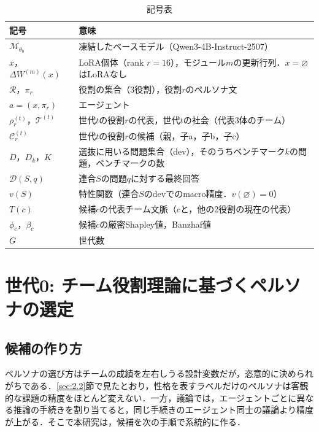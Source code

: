 \begin{table}[htbp]
\caption{記号表}
\label{tab:3.1}
\centering
\small
\begin{tabular}{|l|p{9.0cm}|}
\hline
記号 & 意味 \\
\hline
$\mathcal{M}_{\theta_0}$ & 凍結したベースモデル（Qwen3-4B-Instruct-2507） \\
\hline
$x$，$\Delta W^{(m)}(x)$ & LoRA個体（rank $r = 16$），モジュール$m$の更新行列．$x = \varnothing$はLoRAなし \\
\hline
$\mathcal{R}$，$\pi_r$ & 役割の集合（3役割），役割$r$のペルソナ文 \\
\hline
$a = (x, \pi_r)$ & エージェント \\
\hline
$\rho_r^{(t)}$，$\mathcal{T}^{(t)}$ & 世代$t$の役割$r$の代表，世代$t$の社会（代表3体のチーム） \\
\hline
$\mathcal{C}_r^{(t)}$ & 世代$t$の役割$r$の候補（親，子a，子b，子c） \\
\hline
$D$，$D_k$，$K$ & 選抜に用いる問題集合（dev），そのうちベンチマーク$k$の問題，ベンチマークの数 \\
\hline
$\mathcal{D}(S, q)$ & 連合$S$の問題$q$に対する最終回答 \\
\hline
$v(S)$ & 特性関数（連合$S$のdevでのmacro精度．$v(\varnothing) = 0$） \\
\hline
$T(c)$ & 候補$c$の代表チーム文脈（$c$と，他の2役割の現在の代表） \\
\hline
$\phi_c$，$\beta_c$ & 候補$c$の厳密Shapley値，Banzhaf値 \\
\hline
$G$ & 世代数 \\
\hline
\end{tabular}
\end{table}

\section{世代0: チーム役割理論に基づくペルソナの選定}
\label{sec:3.2}

\subsection{候補の作り方}
\label{sec:3.2.1}

ペルソナの選び方はチームの成績を左右しうる設計変数だが，恣意的に決められがちである．\ref{sec:2.2}節で見たとおり，性格を表すラベルだけのペルソナは客観的な課題の精度をほとんど変えない\cite{zheng2024persona,kim2024persona}．一方，議論では，エージェントごとに異なる推論の手続きを割り当てると，同じ手続きのエージェント同士の議論より精度が上がる\cite{liu2025dmad}．そこで本研究は，候補を次の手順で系統的に作る．

